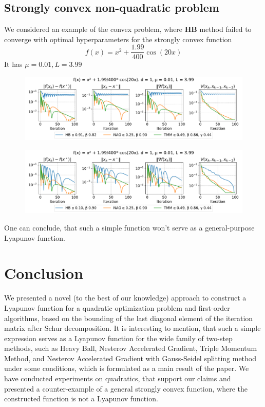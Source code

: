 \documentclass[a4paper,11pt]{article}
\begin{document}
\subsection{Strongly convex non-quadratic problem}
We considered an example of the convex problem, where \textbf{HB} method failed to converge with optimal hyperparameters for the strongly convex function \cite{polyak1987introduction}
$$
f(x) = x^2 + \dfrac{1.99}{400}\cos(20x)
$$
It has $\mu = 0.01, L=3.99$

\begin{figure}[h!]
 \centering
 \includegraphics[width=\linewidth]{str_conv_bad.pdf}
\end{figure}

\begin{figure}[h!]
 \centering
 \includegraphics[width=\linewidth]{str_conv_good.pdf}
\end{figure}

One can conclude, that such a simple function won't serve as a general-purpose Lyapunov function.

\section{Conclusion}
We presented a novel (to the best of our knowledge) approach to construct a Lyapunov function for a quadratic optimization problem and first-order algorithms, based on the bounding of the last diagonal element of the iteration matrix after Schur decomposition. It is interesting to mention, that such a simple expression serves as a Lyapunov function for the wide family of two-step methods, such as Heavy Ball, Nesterov Accelerated Gradient, Triple Momentum Method, and Nesterov Accelerated Gradient with Gauss-Seidel splitting method under some conditions, which is formulated as a main result of the paper. We have conducted experiments on quadratics, that support our claims and presented a counter-example of a general strongly convex function, where the constructed function is not a Lyapunov function.
\end{document}
